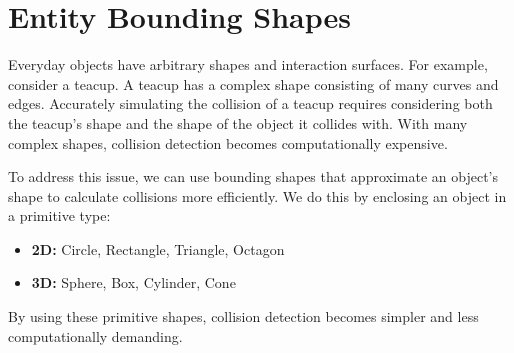 \section{Entity Bounding Shapes}
Everyday objects have arbitrary shapes and interaction surfaces. For example,
consider a teacup. A teacup has a complex shape consisting of many curves and
edges. Accurately simulating the collision of a teacup requires considering
both the teacup's shape and the shape of the object it collides with. With many
complex shapes, collision detection becomes computationally expensive.

To address this issue, we can use bounding shapes that approximate an object's
shape to calculate collisions more efficiently. We do this by enclosing an
object in a primitive type:
\begin{itemize}
    \item \textbf{2D:} Circle, Rectangle, Triangle, Octagon
    \item \textbf{3D:} Sphere, Box, Cylinder, Cone
\end{itemize}

By using these primitive shapes, collision detection becomes simpler and less
computationally demanding.




